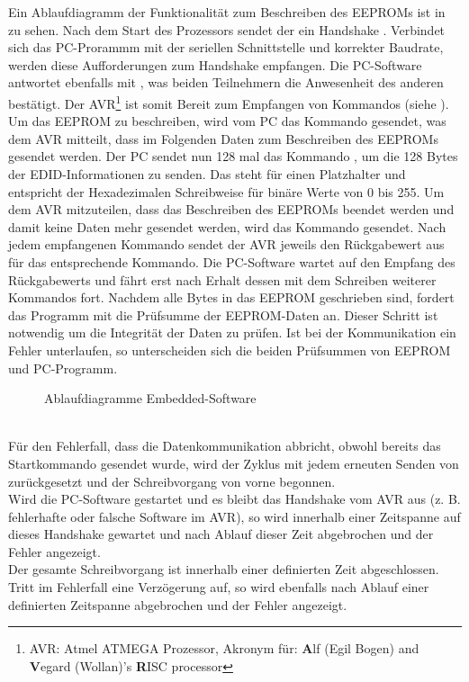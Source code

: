 Ein Ablaufdiagramm der Funktionalität zum Beschreiben des EEPROMs ist in  zu sehen. Nach dem Start des Prozessors sendet der ein Handshake . Verbindet sich das PC-Prorammm mit der seriellen Schnittstelle und korrekter Baudrate, werden diese Aufforderungen zum Handshake empfangen. Die PC-Software antwortet ebenfalls mit , was beiden Teilnehmern die Anwesenheit des anderen bestätigt. Der AVR\footnote{AVR: Atmel ATMEGA Prozessor, Akronym für: \textbf{A}lf (Egil Bogen) and \textbf{V}egard (Wollan)'s \textbf{R}ISC processor} ist somit Bereit zum Empfangen von Kommandos (siehe ). Um das EEPROM zu beschreiben, wird vom PC das Kommando  gesendet, was dem AVR mitteilt, dass im Folgenden Daten zum Beschreiben des EEPROMs gesendet werden. Der PC sendet nun 128 mal das Kommando , um die 128 Bytes der EDID-Informationen zu senden. Das  steht für einen Platzhalter und entspricht der Hexadezimalen Schreibweise für binäre Werte von 0 bis 255. Um dem AVR mitzuteilen, dass das Beschreiben des EEPROMs beendet werden und damit keine Daten mehr gesendet werden, wird das Kommando  gesendet. Nach jedem empfangenen Kommando sendet der AVR jeweils den Rückgabewert aus  für das entsprechende Kommando. Die PC-Software wartet auf den Empfang des Rückgabewerts und fährt erst nach Erhalt dessen mit dem Schreiben weiterer Kommandos fort. Nachdem alle Bytes in das EEPROM geschrieben sind, fordert das Programm mit  die Prüfsumme der EEPROM-Daten an. Dieser Schritt ist notwendig um die Integrität der Daten zu prüfen. Ist bei der Kommunikation ein Fehler unterlaufen, so unterscheiden sich die beiden Prüfsummen von EEPROM und PC-Programm.\\
\begin{figure}[htp]
	\center
    \caption{Ablaufdiagramme Embedded-Software}
    \label{fig:ablaufdiagramm_avr} 
\end{figure}\\

Für den Fehlerfall, dass die Datenkommunikation abbricht, obwohl bereits das Startkommando  gesendet wurde, wird der Zyklus mit jedem erneuten Senden von  zurückgesetzt und der Schreibvorgang von vorne begonnen.\\
Wird die PC-Software gestartet und es bleibt das Handshake vom AVR aus (z. B. fehlerhafte oder falsche Software im AVR), so wird innerhalb einer Zeitspanne auf dieses Handshake gewartet und nach Ablauf dieser Zeit abgebrochen und der Fehler angezeigt.\\
Der gesamte Schreibvorgang ist innerhalb einer definierten Zeit abgeschlossen. Tritt im Fehlerfall eine Verzögerung auf, so wird ebenfalls nach Ablauf einer definierten Zeitspanne abgebrochen und der Fehler angezeigt.
